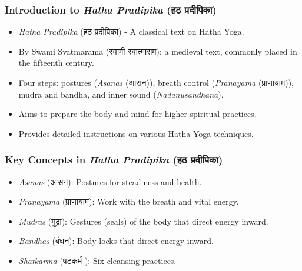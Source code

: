 \begin{frame}[fragile]\frametitle{Introduction to \textit{Hatha Pradipika} (हठ प्रदीपिका)}

      \begin{itemize}
		\item \textit{Hatha Pradipika} (हठ प्रदीपिका) - A classical text on Hatha Yoga.
		\item By Swami Svatmarama (स्वामी स्वात्माराम); a medieval text, commonly placed in the fifteenth century.
		\item Four steps: postures (\textit{Asanas} (आसन)), breath control (\textit{Pranayama} (प्राणायाम)), mudra and bandha, and inner sound (\textit{Nadanusandhana}).
		\item Aims to prepare the body and mind for higher spiritual practices.
		\item Provides detailed instructions on various Hatha Yoga techniques.
	  \end{itemize}

\end{frame}

\begin{frame}[fragile]\frametitle{Key Concepts in \textit{Hatha Pradipika} (हठ प्रदीपिका)}

      \begin{itemize}
		\item \textit{Asanas} (आसन): Postures for steadiness and health.
		\item \textit{Pranayama} (प्राणायाम): Work with the breath and vital energy.
		\item \textit{Mudras} (मुद्रा): Gestures (seals) of the body that direct energy inward.
		\item \textit{Bandhas} (बंधन): Body locks that direct energy inward.
		\item \textit{Shatkarma} (षटकर्म ): Six cleansing practices.
	  \end{itemize}

\end{frame}

